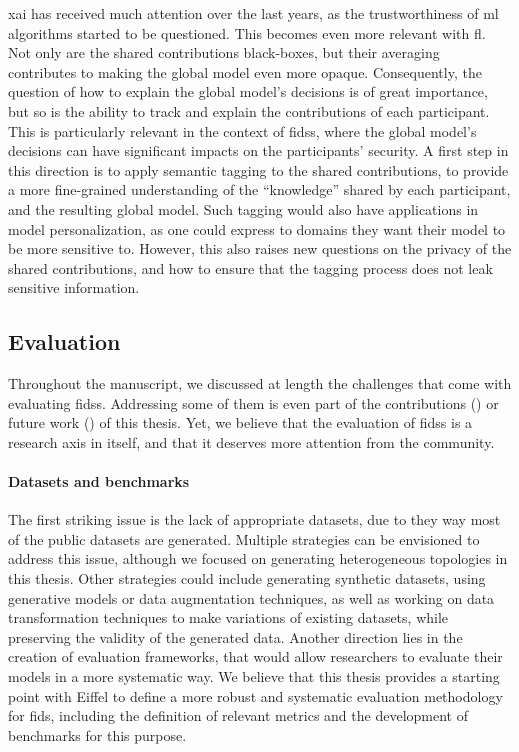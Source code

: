 \Gls{xai} has received much attention over the last years, as the trustworthiness of \gls{ml} algorithms started to be questioned.
This becomes even more relevant with \gls{fl}.
Not only are the shared contributions black-boxes, but their averaging contributes to making the global model even more opaque.
Consequently, the question of how to explain the global model's decisions is of great importance, but so is the ability to track and explain the contributions of each participant.
This is particularly relevant in the context of \glspl{fids}, where the global model's decisions can have significant impacts on the participants' security.
A first step in this direction is to apply semantic tagging to the shared contributions, to provide a more fine-grained understanding of the ``knowledge'' shared by each participant, and the resulting global model.
Such tagging would also have applications in model personalization, as one could express to domains they want their model to be more sensitive to.
However, this also raises new questions on the privacy of the shared contributions, and how to ensure that the tagging process does not leak sensitive information.


\subsection{Evaluation\label{sec:conclusion.perspectives.eval}}


Throughout the manuscript, we discussed at length the challenges that come with evaluating \glspl{fids}.
Addressing some of them is even part of the contributions (\cf {}) or future work () of this thesis.
Yet, we believe that the evaluation of \glspl{fids} is a research axis in itself, and that it deserves more attention from the community.

\paragraph{Datasets and benchmarks}

The first striking issue is the lack of appropriate datasets, due to they way most of the public datasets are generated.
Multiple strategies can be envisioned to address this issue, although we focused on generating heterogeneous topologies in this thesis.
Other strategies could include generating synthetic datasets, using generative models or data augmentation techniques, as well as working on data transformation techniques to make variations of existing datasets, while preserving the validity of the generated data.
Another direction lies in the creation of evaluation frameworks, that would allow researchers to evaluate their models in a more systematic way.
We believe that this thesis provides a starting point with Eiffel to define a more robust and systematic evaluation methodology for \gls{fids}, including the definition of relevant metrics and the development of benchmarks for this purpose.

